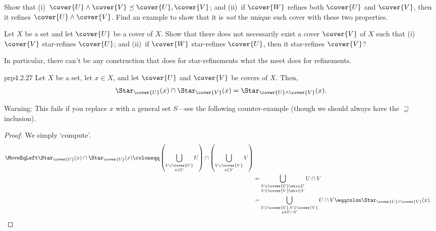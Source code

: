 \begin{exr}{}{}
Show that (i)~$\cover{U}\wedge \cover{V}\preceq \cover{U},\cover{V}$; and (ii)~if $\cover{W}$ refines both $\cover{U}$ and $\cover{V}$, then it refines $\cover{U}\wedge \cover{V}$.  Find an example to show that it is \emph{not} the unique such cover with these two properties.
\end{exr}
\begin{exr}{}{}
Let $X$ be a set and let $\cover{U}$ be a cover of $X$.  Show that there does not necessarily exist a cover $\cover{V}$ of $X$ such that (i)~$\cover{V}$ star-refines $\cover{U}$; and (ii)~if $\cover{W}$ star-refines $\cover{U}$, then it star-refines $\cover{V}$?
\begin{rmk}
In particular, there can't be any construction that does for star-refinements what the meet does for refinements.
\end{rmk}
\end{exr}
\begin{prp}{}{prp4.2.27}
Let $X$ be a set, let $x\in X$, and let $\cover{U}$ and $\cover{V}$ be covers of $X$.  Then,
\begin{equation}
\Star _{\cover{U}}(x)\cap \Star _{\cover{V}}(x)=\Star _{\cover{U}\wedge \cover{V}}(x).
\end{equation}
\begin{wrn}
Warning:  This fails if you replace $x$ with a general set $S$---see the following counter-example (though we should always have the $\supseteq$ inclusion).
\end{wrn}
\begin{proof}
We simply `compute'.
\begin{equation}
\begin{split}
\MoveEqLeft
\Star _{\cover{U}}(x)\cap \Star _{\cover{V}}(x)\coloneqq \left( \bigcup _{\substack{U\in \cover{U} \\ x\in U}}U\right) \cap \left( \bigcup _{\substack{V\in \cover{V} \\ x\in V}}V\right) \\
& =\bigcup _{\substack{U\in \cover{U}\st x\in U \\ V\in \cover{V}\st x\in V}}U\cap V \\
& =\bigcup _{\substack{U\in \cover{U},V\in \cover{V} \\ x\in U\cap V}}U\cap V\eqqcolon \Star _{\cover{U}\wedge \cover{V}}(x).
\end{split}
\end{equation}
\end{proof}
\end{prp}
